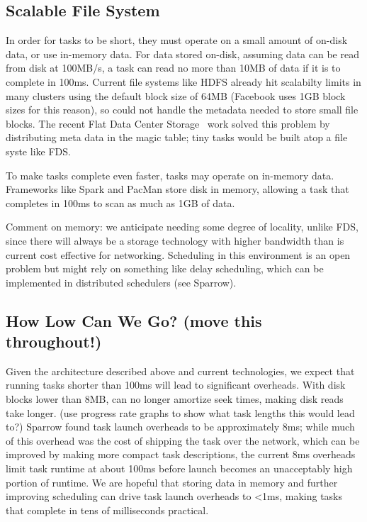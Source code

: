 \subsection{Scalable File System}
In order for tasks to be short, they must operate on a small amount of on-disk
data, or use in-memory data.
For data stored on-disk, assuming data can be read from disk at 100MB/s,
a task can read no more than 10MB of data if it is to complete in 100ms.
Current file systems like HDFS already hit scalabilty limits in many clusters
using the default block size of 64MB (Facebook uses 1GB block sizes for this
reason), so could not handle the metadata needed to store small file blocks.
The recent Flat Data Center Storage~\cite{fds} work solved this problem
by distributing meta data in the magic table; tiny tasks would be built
atop a file syste like FDS.

To make tasks complete even faster, tasks may operate on in-memory data.
Frameworks like Spark and PacMan store disk in memory, allowing a task that
completes in 100ms to scan as much as 1GB of data.

Comment on memory: we anticipate needing some degree of locality, unlike FDS,
since there will always be a storage technology with higher bandwidth than
is current cost effective for networking. Scheduling in this environment
is an open problem but might rely on something like delay scheduling, which
can be implemented in distributed schedulers (see Sparrow).

\subsection{How Low Can We Go? (move this throughout!)}
Given the architecture described above and current technologies, we expect that
running tasks shorter than 100ms will lead to significant overheads. With disk
blocks lower than 8MB, can no longer amortize seek times, making disk reads take
longer. (use progress rate graphs to show what task lengths this would lead to?)
Sparrow found task launch overheads to be approximately 8ms; while much of this
overhead was the cost of shipping the task over the network, which can be
improved by making more compact task descriptions, the current 8ms overheads
limit task runtime at about 100ms before launch becomes an unacceptably high
portion of runtime. We are hopeful that storing data in memory and further
improving scheduling can drive task launch overheads to <1ms, making tasks that
complete in tens of milliseconds practical.

